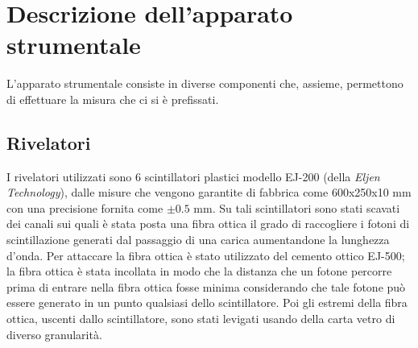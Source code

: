 \section{Descrizione dell'apparato strumentale}
L'apparato strumentale consiste in diverse componenti che, assieme, permettono di effettuare la misura che ci si è prefissati. 
\subsection{Rivelatori}
I rivelatori utilizzati sono 6 scintillatori plastici modello EJ-200 (della \textit{Eljen Technology}), dalle misure che vengono garantite di fabbrica come
600x250x10 mm con una precisione fornita come $\pm 0.5$ mm. Su tali scintillatori sono stati scavati dei canali sui quali è stata  posta una fibra ottica il grado di raccogliere
i fotoni di scintillazione generati dal passaggio di una carica aumentandone la lunghezza d'onda. Per attaccare la fibra ottica è stato utilizzato del cemento ottico EJ-500; la fibra ottica è stata
incollata in modo che la distanza che un fotone percorre prima di entrare nella fibra ottica fosse minima considerando che tale fotone può essere generato in un punto qualsiasi
dello scintillatore. Poi gli estremi della fibra ottica, uscenti dallo scintillatore, sono stati levigati usando della carta vetro di diverso granularit\`a.\\

